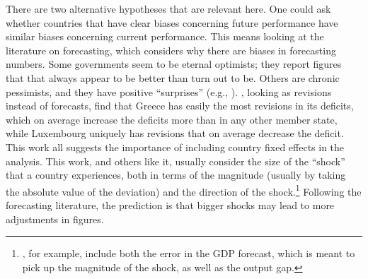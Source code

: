 \documentclass[]{article}
\begin{document}
There are two alternative hypotheses that are relevant here. One could ask whether countries that have clear biases concerning future performance have similar biases concerning current performance. This means looking at the literature on forecasting, which  considers why there are biases in forecasting numbers. Some governments seem to be eternal optimists; they report figures that that always appear to be better than turn out to be. Others are chronic pessimists, and they have positive ``surprises'' (e.g., \citep{Strauchetal2004}). \cite{DeCastro2013}, looking as revisions instead of forecasts, find that Greece has easily the most revisions in its deficits, which on average increase the deficits more than in any other member state, while Luxembourg uniquely has revisions that on average decrease the deficit. This work all suggests the importance of including country fixed effects in the analysis.  This work, and others like it, usually consider the size of the ``shock'' that a country experiences, both in terms of the magnitude (usually by taking the absolute value of the deviation) and the direction of the shock.\footnote{\cite{PinaVenes2011}, for example, include both the error in the GDP forecast, which is meant to pick up the magnitude of the shock, as well as the output gap.}  Following the forecasting literature, the prediction is that bigger shocks may lead to more adjustments in figures.  
\end{document}
